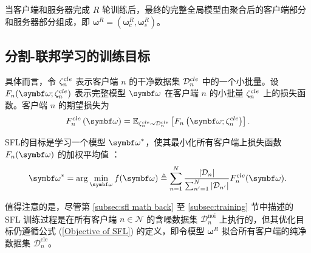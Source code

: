 当客户端和服务器完成 $R$ 轮训练后，最终的完整全局模型由聚合后的客户端部分和服务器部分组成，即 $\boldsymbol{\omega}^R=(\boldsymbol{\omega}_c^R,\boldsymbol{\omega}_s^R)$。
\subsection{分割-联邦学习的训练目标}

具体而言，令 $\zeta^{cle}_n$ 表示客户端 $n$ 的干净数据集 $\mathcal{D}^{cle}_n$ 中的一个小批量。设 $F_n(\omegab;\zetacle_n)$ 表示完整模型 $\omegab$ 在客户端 $n$ 的小批量 $\zeta^{cle}_n$ 上的损失函数。客户端 $n$ 的期望损失为  
\begin{equation}\label{eq:exp-fn}
\fcle_n\left(\omegab\right)=\mathbb{E}_{\zetacle_n\sim \Dcle_n}\left[F_n\left(\omegab;\zetacle_n\right)\right].
\end{equation}

SFL的目标是学习一个模型 $\omegab^*$，使其最小化所有客户端上损失函数 $F_{n}(\omegab)$ 的加权平均值 \cite{b8}：
\begin{equation}\label{Objective of SFL}
\omegab^* =\arg \min_{\omegab}f(\omegab)\triangleq \sum_{n=1}^{N}\frac{|\D_n|}{\sum_{n'=1}^{N}|\D_{n'}|}F^{cle}_{n}(\omegab).
\end{equation}

值得注意的是，尽管第 \ref{subsec:sfl math back} 至 \ref{subsec:training} 节中描述的 SFL 训练过程是在所有客户端 $n\in\mathcal{N}$ 的含噪数据集 $\mathcal{D}^{\text{noi}}_n$ 上执行的，但其优化目标仍遵循公式 (\ref{Objective of SFL}) 的定义，即令模型 $\boldsymbol{\omega}^R$ 拟合所有客户端的纯净数据集 $\mathcal{D}^{\text{cle}}_n$。

